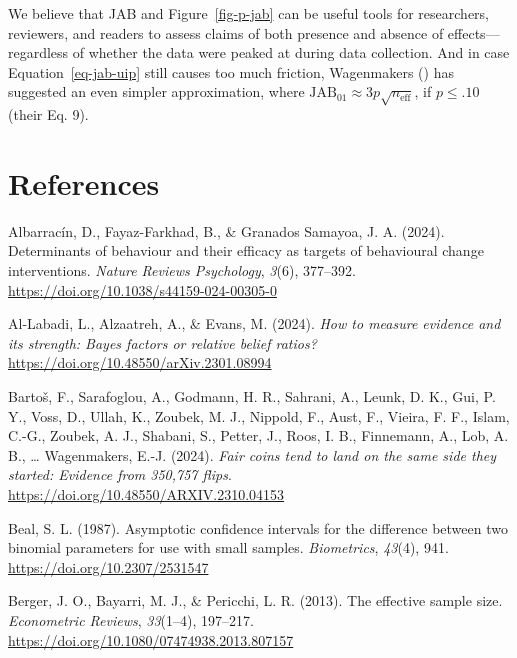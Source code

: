 \documentclass[
  man,
  floatsintext,
  longtable,
  nolmodern,
  notxfonts,
  notimes,
  colorlinks=true,linkcolor=blue,citecolor=blue,urlcolor=blue]{apa7}
\newlength{\cslhangindent}
\newenvironment{CSLReferences}[2] %
 {\begin{list}{}{%
  \setlength{\itemindent}{0pt}
  \setlength{\leftmargin}{0pt}
  \setlength{\parsep}{0pt}
  \ifodd #1
   \setlength{\leftmargin}{\cslhangindent}
   \setlength{\itemindent}{-1\cslhangindent}
  \fi
  \setlength{\itemsep}{#2\baselineskip}}}
 {\end{list}}
\begin{document}
We believe that JAB and Figure~\ref{fig-p-jab} can be useful tools for
researchers, reviewers, and readers to assess claims of both presence
and absence of effects---regardless of whether the data were peaked at
during data collection. And in case Equation~\ref{eq-jab-uip} still
causes too much friction, Wagenmakers
() has suggested an even simpler
approximation, where
\(\text{JAB}_{01} \approx 3 p \sqrt{n_\text{eff}}\), if \(p \leq .10\)
(their Eq. 9).

\clearpage

\section{References}\label{references}

\label{refs}
\begin{CSLReferences}{1}{0}
Albarracín, D., Fayaz-Farkhad, B., \& Granados Samayoa, J. A. (2024).
Determinants of behaviour and their efficacy as targets of behavioural
change interventions. \emph{Nature Reviews Psychology}, \emph{3}(6),
377--392. \url{https://doi.org/10.1038/s44159-024-00305-0}

Al-Labadi, L., Alzaatreh, A., \& Evans, M. (2024). \emph{How to measure
evidence and its strength: Bayes factors or relative belief ratios?}
\url{https://doi.org/10.48550/arXiv.2301.08994}

Bartoš, F., Sarafoglou, A., Godmann, H. R., Sahrani, A., Leunk, D. K.,
Gui, P. Y., Voss, D., Ullah, K., Zoubek, M. J., Nippold, F., Aust, F.,
Vieira, F. F., Islam, C.-G., Zoubek, A. J., Shabani, S., Petter, J.,
Roos, I. B., Finnemann, A., Lob, A. B., \ldots{} Wagenmakers, E.-J.
(2024). \emph{Fair coins tend to land on the same side they started:
Evidence from 350,757 flips}.
\url{https://doi.org/10.48550/ARXIV.2310.04153}

Beal, S. L. (1987). Asymptotic confidence intervals for the difference
between two binomial parameters for use with small samples.
\emph{Biometrics}, \emph{43}(4), 941.
\url{https://doi.org/10.2307/2531547}

Berger, J. O., Bayarri, M. J., \& Pericchi, L. R. (2013). The effective
sample size. \emph{Econometric Reviews}, \emph{33}(1--4), 197--217.
\url{https://doi.org/10.1080/07474938.2013.807157}


\end{CSLReferences}
\end{document}
